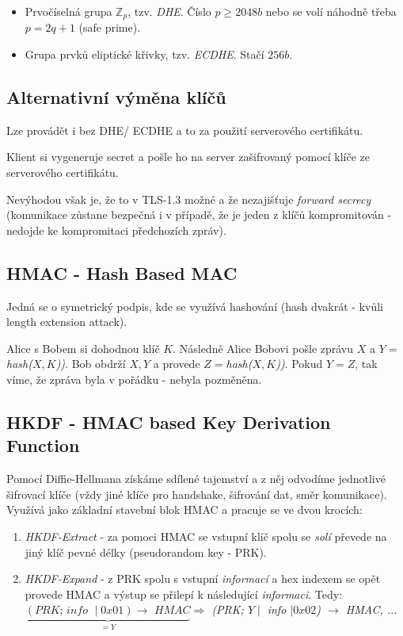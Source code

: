 \documentclass[10pt,a4paper]{article}
\newcommand{\Z}{{\mathbb{Z}}}       %
\begin{document}
\begin{itemize}
	\item Prvočíselná grupa $ \Z_p $, tzv. \textit{DHE}. Číslo $p\geq 2048b$ nebo se volí náhodně třeba $p = 2q+1$ (safe prime).
	\item Grupa prvků eliptické křivky, tzv. \textit{ECDHE}. Stačí $ 256b $.
\end{itemize}

\subsection{Alternativní výměna klíčů}

Lze provádět i bez DHE/ ECDHE a to za použití serverového certifikátu.

Klient si vygeneruje secret a pošle ho na server zašifrovaný pomocí klíče ze serverového certifikátu.

Nevýhodou však je, že to v TLS-1.3 možné a že nezajišťuje \textit{forward secrecy} (komunikace zůstane bezpečná i v případě, že je jeden z klíčů kompromitován - nedojde ke kompromitaci předchozích zpráv).

\subsection{HMAC - Hash Based MAC}

Jedná se o symetrický podpis, kde se využívá hashování (hash dvakrát - kvůli length extension attack).

Alice s Bobem si dohodnou klíč $K$. Následně Alice Bobovi pošle zprávu $X$ a $Y=$\textit{hash($X, K$))}. Bob obdrží $X,Y$ a provede $Z=$\textit{hash($X, K$))}. Pokud $Y=Z$, tak víme, že zpráva byla v pořádku - nebyla pozměněna.



\subsection{HKDF - HMAC based Key Derivation Function}

Pomocí Diffie-Hellmana získáme sdílené tajemství a z něj odvodíme jednotlivé šifrovací klíče (vždy jiné klíče pro handshake, šifrování dat, směr komunikace).
Využívá jako základní stavební blok HMAC a pracuje se ve dvou krocích:
\begin{enumerate}
	\item \textit{HKDF-Extract} - za pomoci HMAC se vstupní klíč spolu se \textit{solí} převede na jiný klíč pevné délky (pseudorandom key - PRK).
	\item \textit{HKDF-Expand} - z PRK spolu s vstupní \textit{informací} a hex indexem se opět provede HMAC a výstup se přilepí k následující \textit{informaci}.
	Tedy: \textit{$\underbrace{(\textit{PRK; info }\mid 0x01)  \to \textit{ HMAC}}_{=Y} \Rightarrow $ (PRK; $Y \mid $ info $ \mid 0x02 $) $ \to $ HMAC, ...}
\end{enumerate}
\end{document}
